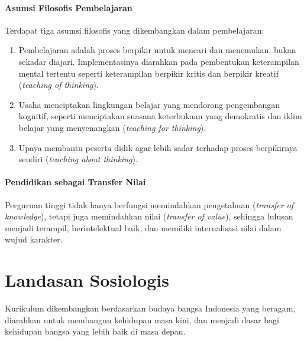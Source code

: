 \paragraph{Asumsi Filosofis Pembelajaran} Terdapat tiga asumsi filosofis yang dikembangkan dalam pembelajaran:
\begin{enumerate}
\item Pembelajaran adalah proses berpikir untuk mencari dan menemukan, bukan sekadar diajari. Implementasinya diarahkan pada pembentukan keterampilan mental tertentu seperti keterampilan berpikir kritis dan berpikir kreatif (\emph{teaching of thinking}).
\item Usaha menciptakan lingkungan belajar yang mendorong pengembangan kognitif, seperti menciptakan suasana keterbukaan yang demokratis dan iklim belajar yang menyenangkan (\emph{teaching for thinking}).
\item Upaya membantu peserta didik agar lebih sadar terhadap proses berpikirnya sendiri (\emph{teaching about thinking}).
\end{enumerate}

\paragraph{Pendidikan sebagai Transfer Nilai} Perguruan tinggi tidak hanya berfungsi memindahkan pengetahuan (\emph{transfer of knowledge}), tetapi juga memindahkan nilai (\emph{transfer of value}), sehingga lulusan menjadi terampil, berintelektual baik, dan memiliki internalisasi nilai dalam wujud karakter.

\section{Landasan Sosiologis}

Kurikulum dikembangkan berdasarkan budaya bangsa Indonesia yang beragam, diarahkan untuk membangun kehidupan masa kini, dan menjadi dasar bagi kehidupan bangsa yang lebih baik di masa depan.

